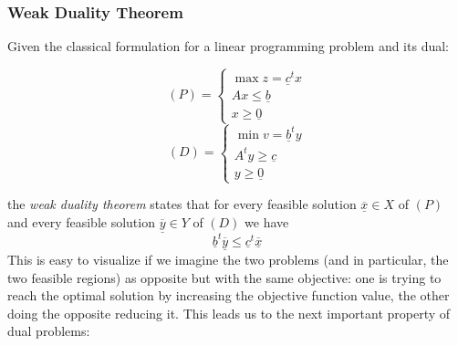 \documentclass{article}
\begin{document}
			\subsubsection{Weak Duality Theorem}
				Given the classical formulation for a linear programming problem and its dual:
				\begin{multicols}{2}
					\begin{equation}
						(P) = 
						\begin{cases}
							\max z = \underline{c}^tx \\
							Ax \leq \underline{b} \\
							x \geq \underline{0}
						\end{cases}
					\end{equation}
					\break
					\begin{equation}
						(D) = 
						\begin{cases}
							\min v = \underline{b}^ty \\
							A^ty \geq \underline{c} \\
							y \geq \underline{0}
						\end{cases}
					\end{equation}
				\end{multicols}
				the \textit{weak duality theorem} states that for every feasible solution $\underline{\overline{x}} \in X$ of $(P)$ and every feasible solution $\underline{\overline{y}} \in Y$ of $(D)$ we have
				\begin{equation}
					\underline{b}^t\underline{\overline{y}} \leq \underline{c}^t\underline{\overline{x}}
				\end{equation}
				This is easy to visualize if we imagine the two problems (and in particular, the two feasible regions) as opposite but with the same objective: one is trying to reach the optimal solution by increasing the objective function value, the other doing the opposite reducing it. This leads us to the next important property of dual problems:
\end{document}
